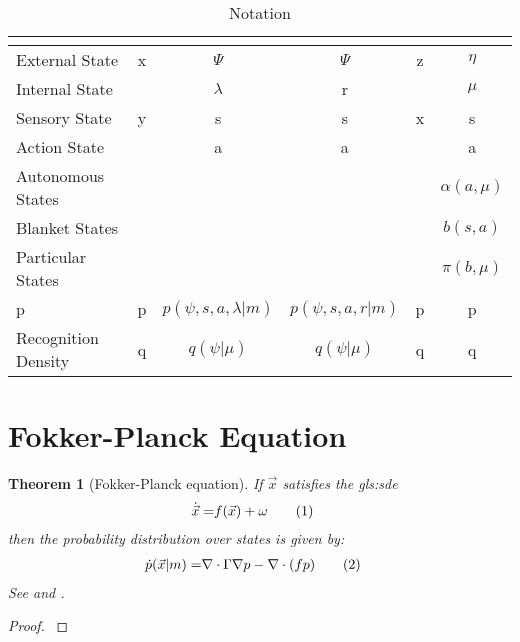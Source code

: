 \documentclass[]{article}
\newcommand\numberthis{\addtocounter{equation}{1}\tag{\theequation}}
\newtheorem{thm}{Theorem}
\begin{document}
\begin{table}[H]
	\begin{center}
		\caption{Notation}
		\begin{tabular}{|l|c|c|c|c|c|}\hline
			&\cite{beal2003variational}&\cite{friston_life_2013}&\cite{friston2016therefore}&\cite{Blei2017}&\cite{friston2022free}\\ \hline
			External State&x&$\Psi$&$\Psi$&z&$\eta$\\ \hline
			Internal State&&$\lambda$&r&&$\mu$\\ \hline
			Sensory State&y&s&s&x&s\\ \hline
			Action State&&a&a&&a\\ \hline
			Autonomous States&&&&& $\alpha(a,\mu)$\\\hline
			Blanket States&&&&&$b(s,a)$\\ \hline
			Particular States&&&&&$\pi(b,\mu)$\\ \hline
			p&p&$p(\psi,s,a,\lambda\vert m)$&$p(\psi,s,a,r\vert m)$&p&p\\ \hline
			Recognition Density&q&$q(\psi\vert \mu)$&$q(\psi\vert \mu)$&q&q\\ \hline
		\end{tabular}
	\end{center}
\end{table}

\section{Fokker-Planck Equation}

\begin{thm}[Fokker-Planck equation]
	If $\vec{x}$ satisfies the \gls{gls:sde}
	\begin{align*}
		\dot{\vec{x}} =& f(\vec{x}) + \omega \numberthis \label{eq:dynamics}
	\end{align*}
	then the probability distribution over states is given by:
	\begin{align*}
		\dot{p}(\vec{x}\vert m) =& \nabla \cdot \Gamma \nabla p -\nabla \cdot(f p) \numberthis \label{eq:fokker:planck}
	\end{align*}
	See \cite[(2.2)]{friston_life_2013} and  \cite[Chapter 33]{cvitanovic2005chaos}.
\end{thm}

\begin{proof}
	\cite[Section 33.3]{cvitanovic2005chaos}
\end{proof}

\cite{friston_life_2013,friston2012free}
\end{document}
